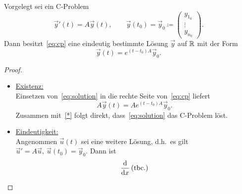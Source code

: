 \begin{theorem}\label{thm:existenz-eindeutigkeit}
    Vorgelegt sei ein C-Problem
    \begin{equation}\tag{CP}\label{eq:cp}
        \vec{y}'(t) = A \vec{y}(t), \qquad \vec{y}(t_0) = \vec{y}_0 \coloneqq \begin{pmatrix} y_{1_0}\\ \vdots\\ y_{n_0} \end{pmatrix}.
    \end{equation}
    Dann besitzt~\eqref{eq:cp} eine eindeutig bestimmte Lösung $\vec{y}$ auf $\mathbb{R}$ mit der Form
    \begin{equation}\tag{$\ast$}\label{eq:solution}
        \vec{y}(t) = e^{(t - t_0) A} \vec{y}_0.
    \end{equation}
\end{theorem}

\begin{proof}
    \begin{itemize}
        \item   \underline{Existenz:}\\
                Einsetzen von~\eqref{eq:solution} in die rechte Seite von~\eqref{eq:cp} liefert
                \begin{equation*}
                    A \vec{y}(t) = A e^{(t - t_0) A} \vec{y}_0.
                \end{equation*}
                Zusammen mit~\eqref{*} folgt direkt, dass~\eqref{eq:solution} das C-Problem löst.

        \item   \underline{Eindeutigkeit:}\\
                Angenommen $\vec{u}(t)$ sei eine weitere Lösung, d.h.~es gilt $\vec{u}' = A \vec{u},\ \vec{u}(t_0) = \vec{y}_0$.
                Dann ist
                \begin{align*}
                    \frac{\mathrm{d} }{\mathrm{d} x} \left( \text{tbc.} \right)
                \end{align*}
    \end{itemize}
\end{proof}